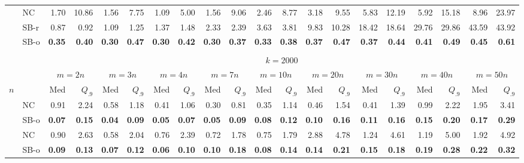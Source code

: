 \documentclass[runningheads,a4paper]{llncs}
\begin{document}
\begin{sidewaystable}
\begin{tabularx}{1\textwidth}{p{0.8cm}p{0.8cm}|RR|RR|RR|RR|RR|RR|RR|RR|RR}
\hline
\centering{} & \centering NC & 1.70 & 10.86 & 1.56 & 7.75 & 1.09 & 5.00 & 1.56 & 9.06 & 2.46 & 8.77 & 3.18 & 9.55 & 5.83 & 12.19 & 5.92 & 15.18 & 8.96 & 23.97 \\
 & \centering SB-r  & 0.87 & 0.92 & 1.09 & 1.25 & 1.37 & 1.48 & 2.33 & 2.39 & 3.63 & 3.81 & 9.83 & 10.28 & 18.42 & 18.64 & 29.76 & 29.86 & 43.59 & 43.92 \\
 & \centering SB-o  & \textbf{0.35} & \textbf{0.40} & \textbf{0.30} & \textbf{0.47} & \textbf{0.30} & \textbf{0.42} & \textbf{0.30} & \textbf{0.37} & \textbf{0.33} & \textbf{0.38} & \textbf{0.37} & \textbf{0.47} & \textbf{0.37} & \textbf{0.44} & \textbf{0.41} & \textbf{0.49} & \textbf{0.45} & \textbf{0.61} \\
\hline
\\
  & &  \\
  & &  &  &  &  &  &  &  &  &  \\
\centering $n$ & & Med & $Q_{.9}$ & Med & $Q_{.9}$ & Med & $Q_{.9}$ & Med & $Q_{.9}$ & Med & $Q_{.9}$ & Med & $Q_{.9}$ & Med & $Q_{.9}$ & Med & $Q_{.9}$ & Med & $Q_{.9}$ \\
\hline
\centering{} & \centering NC & 0.91 & 2.24 & 0.58 & 1.18 & 0.41 & 1.06 & 0.30 & 0.81 & 0.35 & 1.14 & 0.46 & 1.54 & 0.41 & 1.39 & 0.99 & 2.22 & 1.95 & 3.41 \\
 & \centering SB-o  & \textbf{0.07} & \textbf{0.15} & \textbf{0.04} & \textbf{0.09} & \textbf{0.05} & \textbf{0.07} & \textbf{0.05} & \textbf{0.09} & \textbf{0.08} & \textbf{0.12} & \textbf{0.10} & \textbf{0.16} & \textbf{0.11} & \textbf{0.16} & \textbf{0.15} & \textbf{0.20} & \textbf{0.17} & \textbf{0.29} \\
\hline
\centering{} & \centering NC & 0.90 & 2.63 & 0.58 & 2.04 & 0.76 & 2.39 & 0.72 & 1.78 & 0.75 & 1.79 & 2.88 & 4.78 & 1.24 & 4.61 & 1.19 & 5.00 & 1.92 & 4.92 \\
 & \centering SB-o  & \textbf{0.09} & \textbf{0.13} & \textbf{0.07} & \textbf{0.12} & \textbf{0.06} & \textbf{0.10} & \textbf{0.10} & \textbf{0.18} & \textbf{0.08} & \textbf{0.14} & \textbf{0.14} & \textbf{0.21} & \textbf{0.15} & \textbf{0.18} & \textbf{0.19} & \textbf{0.28} & \textbf{0.22} & \textbf{0.32} \\

\end{tabularx}
\end{sidewaystable}
\end{document}
